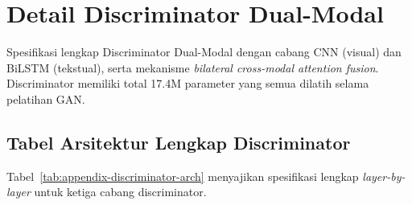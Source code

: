 \section{Detail Discriminator Dual-Modal}
\label{appendix:discriminator-details}

Spesifikasi lengkap Discriminator Dual-Modal dengan cabang CNN (visual) dan BiLSTM (tekstual), serta mekanisme \textit{bilateral cross-modal attention fusion}. Discriminator memiliki total 17.4M parameter yang semua dilatih selama pelatihan GAN.

\subsection{Tabel Arsitektur Lengkap Discriminator}
\label{appendix:discriminator-arch-table}

Tabel~\ref{tab:appendix-discriminator-arch} menyajikan spesifikasi lengkap \textit{layer-by-layer} untuk ketiga cabang discriminator.

